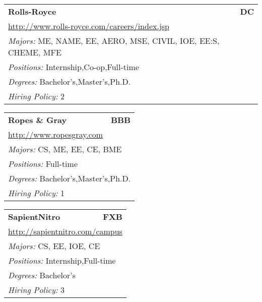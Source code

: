 \documentclass[twoside]{article}
\begin{document}
\begin{center}
\begin{multicols}{3}
\begin{FlushLeft}
\begin{minipage}{.9\columnwidth}
\end{minipage}
 
\begin{minipage}{.9\columnwidth}\begin{tabularx}{.95\columnwidth}{Xr}
                 {\Large\bf Rolls-Royce} & {\Large\bf DC}\\
    \multicolumn{2}{p{.95\columnwidth}}{\url{http://www.rolls-royce.com/careers/index.jsp}}\\
    \multicolumn{2}{p{.95\columnwidth}}{\emph{Majors:} ME, NAME, EE, AERO, MSE, CIVIL, IOE, EE:S, CHEME, MFE}\\
    \multicolumn{2}{p{.95\columnwidth}}{\emph{Positions:} Internship,Co-op,Full-time}\\
    \multicolumn{2}{p{.95\columnwidth}}{\emph{Degrees:} Bachelor's,Master's,Ph.D.}\\
    \multicolumn{2}{p{.95\columnwidth}}{\emph{Hiring Policy:} 2}\\
    \end{tabularx}
    
\end{minipage}
 
\begin{minipage}{.9\columnwidth}\begin{tabularx}{.95\columnwidth}{Xr}
                 {\Large\bf Ropes \& Gray} & {\Large\bf BBB}\\
    \multicolumn{2}{p{.95\columnwidth}}{\url{http://www.ropesgray.com}}\\
    \multicolumn{2}{p{.95\columnwidth}}{\emph{Majors:} CS, ME, EE, CE, BME}\\
    \multicolumn{2}{p{.95\columnwidth}}{\emph{Positions:} Full-time}\\
    \multicolumn{2}{p{.95\columnwidth}}{\emph{Degrees:} Bachelor's,Master's,Ph.D.}\\
    \multicolumn{2}{p{.95\columnwidth}}{\emph{Hiring Policy:} 1}\\
    \end{tabularx}
    
\end{minipage}
 
\begin{minipage}{.9\columnwidth}\begin{tabularx}{.95\columnwidth}{Xr}
                 {\Large\bf SapientNitro} & {\Large\bf FXB}\\
    \multicolumn{2}{p{.95\columnwidth}}{\url{http://sapientnitro.com/campus}}\\
    \multicolumn{2}{p{.95\columnwidth}}{\emph{Majors:} CS, EE, IOE, CE}\\
    \multicolumn{2}{p{.95\columnwidth}}{\emph{Positions:} Internship,Full-time}\\
    \multicolumn{2}{p{.95\columnwidth}}{\emph{Degrees:} Bachelor's}\\
    \multicolumn{2}{p{.95\columnwidth}}{\emph{Hiring Policy:} 3}\\
    \end{tabularx}
    

\end{minipage}
\end{FlushLeft}
\end{multicols}
\end{center}
\end{document}
